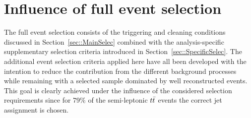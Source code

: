 \section{Influence of full event selection} \label{sec::DataMC} %
The full event selection consists of the triggering and cleaning conditions discussed in Section~\ref{sec::MainSelec} combined with the analysis-specific supplementary selection criteria introduced in Section~\ref{sec::SpecificSelec}.
The additional event selection criteria applied here have all been developed with the intention to reduce the contribution from the different background processes while remaining with a selected sample dominated by well reconstructed events.
This goal is clearly achieved under the influence of the considered selection requirements
since for 79$\%$ of the semi-leptonic $t\bar{t}$ events the correct jet assignment is chosen.
\\

